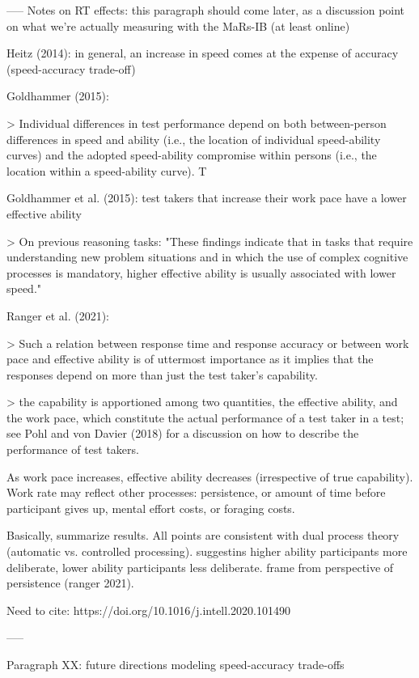 \documentclass[a4paper,man,natbib]{apa6}
\begin{document}
-----
Notes on RT effects: this paragraph should come later, as a discussion point on what we're actually measuring with the MaRs-IB (at least online)

Heitz (2014): in general, an increase in speed comes at the expense of accuracy (speed-accuracy trade-off)

Goldhammer (2015): 

> Individual differences in test performance depend on both between-person differences in speed and ability (i.e., the location of individual speed-ability curves) and the adopted speed-ability compromise within persons (i.e., the location within a speed-ability curve). T

Goldhammer et al. (2015): test takers that increase their work pace have a lower effective ability

> On previous reasoning tasks: "These findings indicate that in tasks that require understanding new problem situations and in which the use of complex cognitive processes is mandatory, higher effective ability is usually associated with lower speed." 

Ranger et al. (2021): 

> Such a relation between response time and response accuracy or between work pace and effective ability is of uttermost importance as it implies that the responses depend on more than just the test taker’s capability.

> the capability is apportioned among two quantities, the effective ability, and the work pace, which constitute the actual performance of a test taker in a test; see Pohl and von Davier (2018) for a discussion on how to describe the performance of test takers. 

As work pace increases, effective ability decreases (irrespective of true capability). Work rate may reflect other processes: persistence, or amount of time before participant gives up, mental effort costs, or foraging costs.  

Basically, summarize results. All points are consistent with dual process theory (automatic vs. controlled processing). suggestins higher ability participants more deliberate, lower ability participants less deliberate. frame from perspective of persistence (ranger 2021).

Need to cite: https://doi.org/10.1016/j.intell.2020.101490

-----

Paragraph XX: future directions modeling speed-accuracy trade-offs
\end{document}
